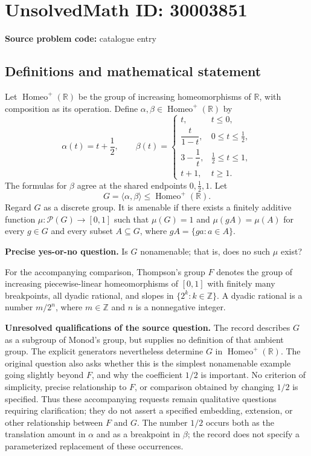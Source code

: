 \documentclass[11pt]{article}
\newcommand{\Z}{\mathbb{Z}}
\newcommand{\R}{\mathbb{R}}
\begin{document}
\section*{UnsolvedMath ID: 30003851}
\textbf{Source problem code:} catalogue entry
\subsection{Definitions and mathematical statement}
Let \(\operatorname{Homeo}^{+}(\R)\) be the group of increasing homeomorphisms of \(\R\), with composition as its operation. Define \(\alpha,\beta\in\operatorname{Homeo}^{+}(\R)\) by
\[
\alpha(t)=t+\frac12,\qquad
\beta(t)=
\begin{cases}
t,&t\leq0,\\
\dfrac{t}{1-t},&0\leq t\leq\frac12,\\
3-\dfrac1t,&\frac12\leq t\leq1,\\
t+1,&t\geq1.
\end{cases}
\]
The formulas for \(\beta\) agree at the shared endpoints \(0,\frac12,1\). Let
\[
G=\langle\alpha,\beta\rangle\leq\operatorname{Homeo}^{+}(\R).
\]
Regard \(G\) as a discrete group. It is amenable if there exists a finitely additive function \(\mu:\mathcal P(G)\to[0,1]\) such that \(\mu(G)=1\) and \(\mu(gA)=\mu(A)\) for every \(g\in G\) and every subset \(A\subseteq G\), where \(gA=\{ga:a\in A\}\).

\textbf{Precise yes-or-no question.} Is \(G\) nonamenable; that is, does no such \(\mu\) exist?

For the accompanying comparison, Thompson's group \(F\) denotes the group of increasing piecewise-linear homeomorphisms of \([0,1]\) with finitely many breakpoints, all dyadic rational, and slopes in \(\{2^k:k\in\Z\}\). A dyadic rational is a number \(m/2^n\), where \(m\in\Z\) and \(n\) is a nonnegative integer.

\textbf{Unresolved qualifications of the source question.} The record describes \(G\) as a subgroup of Monod's group, but supplies no definition of that ambient group. The explicit generators nevertheless determine \(G\) in \(\operatorname{Homeo}^{+}(\R)\). The original question also asks whether this is the simplest nonamenable example going slightly beyond \(F\), and why the coefficient \(1/2\) is important. No criterion of simplicity, precise relationship to \(F\), or comparison obtained by changing \(1/2\) is specified. Thus these accompanying requests remain qualitative questions requiring clarification; they do not assert a specified embedding, extension, or other relationship between \(F\) and \(G\). The number \(1/2\) occurs both as the translation amount in \(\alpha\) and as a breakpoint in \(\beta\); the record does not specify a parameterized replacement of these occurrences.
\end{document}
